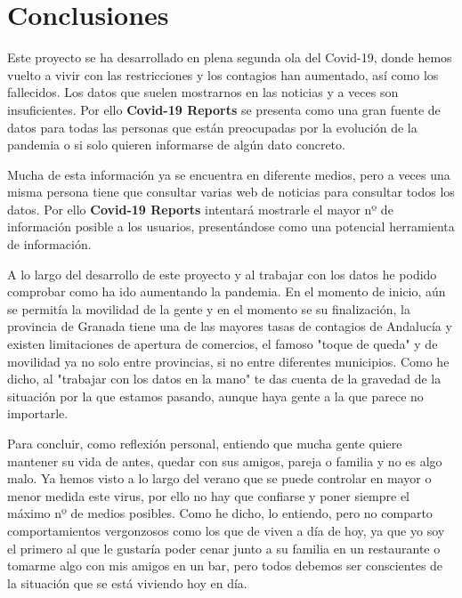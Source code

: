 \chapter{Conclusiones}

Este proyecto se ha desarrollado en plena segunda ola del Covid-19, donde hemos vuelto a vivir con las restricciones y los contagios han aumentado, así como los fallecidos. Los datos que suelen mostrarnos en las noticias y a veces son insuficientes. Por ello \textbf{Covid-19 Reports} se presenta como una gran fuente de datos para todas las personas que están preocupadas por la evolución de la pandemia o si solo quieren informarse de algún dato concreto.

Mucha de esta información ya se encuentra en diferente medios, pero a veces una misma persona tiene que consultar varias web de noticias para consultar todos los datos. Por ello \textbf{Covid-19 Reports} intentará mostrarle el mayor nº de información posible a los usuarios, presentándose como una potencial herramienta de información.

A lo largo del desarrollo de este proyecto y al trabajar con los datos he podido comprobar como ha ido aumentando la pandemia. En el momento de inicio, aún se permitía la movilidad de la gente y en el momento se su finalización, la provincia de Granada tiene una de las mayores tasas de contagios de Andalucía y existen limitaciones de apertura de comercios, el famoso "toque de queda" y de movilidad ya no solo entre provincias, si no entre diferentes municipios. Como he dicho, al "trabajar con los datos en la mano" te das cuenta de la gravedad de la situación por la que estamos pasando, aunque haya gente a la que parece no importarle.

Para concluir, como reflexión personal, entiendo que mucha gente quiere mantener su vida de antes, quedar con sus amigos, pareja o familia y no es algo malo. Ya hemos visto a lo largo del verano que se puede controlar en mayor o menor medida este virus, por ello no hay que confiarse y poner siempre el máximo nº de medios posibles. Como he dicho, lo entiendo, pero no comparto comportamientos vergonzosos como los que de viven a día de hoy, ya que yo soy el primero al que le gustaría poder cenar junto a su familia en un restaurante o tomarme algo con mis amigos en un bar, pero todos debemos ser conscientes de la situación que se está viviendo hoy en día.